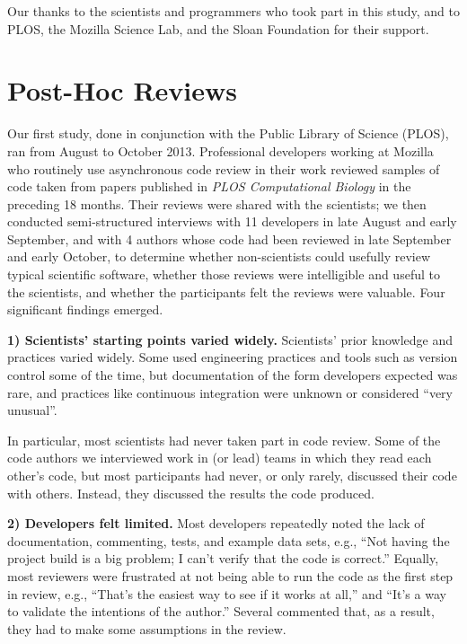 \documentclass[10pt,twocolumn]{article}
\begin{document}
Our thanks to the scientists and programmers who took part in this study,
and to PLOS, the Mozilla Science Lab, and the Sloan Foundation for their support.

\section{Post-Hoc Reviews}

Our first study,
done in conjunction with the Public Library of Science (PLOS),
ran from August to October 2013.
Professional developers working at Mozilla
who routinely use asynchronous code review in their work
reviewed samples of code
taken from papers published in \emph{PLOS Computational Biology} in the preceding 18 months.
Their reviews were shared with the scientists;
we then conducted semi-structured interviews \cite{b:rosenthal2007,b:bryman2008} with 11 developers in late August and early September,
and with 4 authors whose code had been reviewed in late September and early October,
to determine
whether non-scientists could usefully review typical scientific software,
whether those reviews were intelligible and useful to the scientists,
and whether the participants felt the reviews were valuable.
Four significant findings emerged.

\noindent \textbf{1) Scientists' starting points varied widely.}
Scientists' prior knowledge and practices varied widely.
Some used engineering practices and tools such as version control some of the time,
but documentation of the form developers expected was rare,
and practices like continuous integration were unknown or considered ``very unusual''.

In particular,
most scientists had never taken part in code review.
Some of the code authors we interviewed work in (or lead) teams in which they read each other's code,
but most participants had never, or only rarely, discussed their code with others.
Instead, they discussed the results the code produced.

\noindent \textbf{2) Developers felt limited.}
Most developers repeatedly noted
the lack of documentation, commenting, tests, and example data sets,
e.g.,
``Not having the project build is a big problem; I can't verify that the code is correct.''
Equally,
most reviewers were frustrated at not being able to run the code as the first step in review,
e.g.,
``That's the easiest way to see if it works at all,''
and
``It's a way to validate the intentions of the author.''
Several commented that, as a result, they had to make some assumptions in the review.
\end{document}
